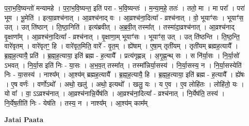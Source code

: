 \documentclass[17pt]{extarticle}
\begin{document}
प॒रा॒भ॒वि॒ष्यन्तो॑ मन्यामहे । प॒रा॒भ॒वि॒ष्यन्त॒ इति॑ परा - भ॒वि॒ष्यन्तः॑ । म॒न्या॒म॒हे॒ ततः॑ । ततो॒ मा । मा परा᳚ । परा॑ भूम । भू॒मेति॑ । इत्या॒व्रश्च॑नात् । आ॒व्रश्च॑नाद् वः । आ॒व्रश्च॑ना॒दित्या᳚ - व्रश्च॑नात् । वो॒ भूयाꣳ॑सः । भूयाꣳ॑स॒ उत् । उत् ति॑ष्ठान् । ति॒ष्ठा॒निति॑ । इत्य॑ब्रवीत् । अ॒ब्र॒वी॒त् तस्मा᳚त् । तस्मा॑दा॒व्रश्च॑नात् । आ॒व्रश्च॑नाद् वृ॒क्षाणा᳚म् । आ॒व्रश्च॑ना॒दित्या᳚ - व्रश्च॑नात् । वृ॒क्षाणा॒म् भूयाꣳ॑सः । भूयाꣳ॑स॒ उत् । उत् ति॑ष्ठन्ति । ति॒ष्ठ॒न्ति॒ वारे॑वृतम् । वारे॑वृतꣳ॒॒ हि । वारे॑वृत॒मिति॒ वारे᳚ - वृ॒त॒म् । ह्ये॑षाम् । ए॒षा॒म् तृती॑यम् । तृती॑यम् ब्रह्मह॒त्यायै᳚ । ब्र॒ह्म॒ह॒त्यायै॒ प्रति॑ । ब्र॒ह्म॒ह॒त्याया॒ इति॑ ब्रह्म - ह॒त्यायै᳚ । प्रत्य॑गृह्णन्न् । अ॒गृ॒ह्ण॒न्थ् सः । स नि॑र्या॒सः । नि॒र्या॒सो॑ ऽभवत् । नि॒र्या॒स इति॑ निः - या॒सः । अ॒भ॒व॒त् तस्मा᳚त् । तस्मा᳚न्निर्या॒सस्य॑ । नि॒र्या॒सस्य॒ न । नि॒र्या॒सस्येति॑ निः - या॒सस्य॑ । नाश्य᳚म् । आ॒श्य॑म् ब्रह्मह॒त्यायै᳚ । ब्र॒ह्म॒ह॒त्यायै॒ हि । ब्र॒ह्म॒ह॒त्याया॒ इति॑ ब्रह्म - ह॒त्यायै᳚ । ह्ये॑षः । ए॒ष वर्णः॑ । वर्णोऽथो᳚ । अथो॒ खलु॑ । अथो॒ इत्यथो᳚ । खलु॒ यः । य ए॒व । ए॒व लोहि॑तः । लोहि॑तो॒ यः । यो वा᳚ । वा॒ ऽऽव्रश्च॑नात् । आ॒व्रश्च॑नान्नि॒र्येष॑ति । आ॒व्रश्च॑ना॒दित्या᳚ - व्रश्च॑नात् । नि॒र्येष॑ति॒ तस्य॑ । नि॒र्येष॒तीति॑ निः - येष॑ति । तस्य॒ न । नाश्य᳚म् । आ॒श्य॑म् काम᳚म् \newline

\textbf{Jatai Paata} \newline
\end{document}
